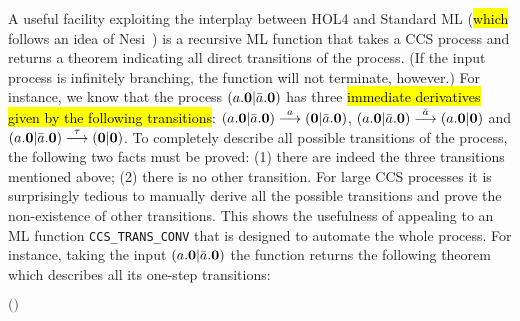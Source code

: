 A useful facility exploiting the interplay
between HOL4 and Standard ML (\hl{which} follows an idea of Nesi~\cite{Nesi:1992ve})
 is a recursive ML function that takes a CCS process and returns a theorem indicating all
  direct transitions of the process. (If the input process is
 infinitely branching, the function will not terminate, however.)
For instance, we know that the process $(a.{\boldsymbol 0} | \bar{a}.{\boldsymbol 0})$ has three
\hl{immediate derivatives given by the following transitions}:
$(a.{\boldsymbol 0} | \bar{a}.{\boldsymbol 0}) \overset{a}{\longrightarrow}
({\boldsymbol 0} | \bar{a}.{\boldsymbol 0})$, $(a.{\boldsymbol 0} | \bar{a}.{\boldsymbol 0})
\overset{\bar{a}}{\longrightarrow} (a.{\boldsymbol 0} | {\boldsymbol 0})$ and $(a.{\boldsymbol 0} | \bar{a}.{\boldsymbol 0})
\overset{\tau}{\longrightarrow} ({\boldsymbol 0} | {\boldsymbol 0})$.
To completely describe all possible transitions of the process, the
following two facts must be proved: (1) there are indeed the three
  transitions mentioned above; (2) there is no other
  transition. For large CCS processes it is surprisingly tedious to manually derive
all the possible transitions and prove the non-existence of other transitions.
This shows the usefulness of appealing to an ML function
\texttt{CCS\_TRANS\_CONV} that is designed to automate the whole process.
For instance, taking the input $(a.{\boldsymbol 0} | \bar{a}.{\boldsymbol 0})$ the function returns the
following theorem which describes all its one-step transitions:
\begin{alltt}
\HOLTokenTurnstile{} \HOLConst{\HOLTokenInputAct} \HOLSymConst{\ensuremath{\ldotp}} \HOLSymConst{\ensuremath{\mid}} \HOLConst{\HOLTokenOutputAct} \HOLSymConst{\ensuremath{\ldotp}} \HOLTokenTransBegin{}\HOLTokenTransEnd {} \HOLSymConst{\HOLTokenEquiv{}}
   \ensuremath{(} \HOLSymConst{\ensuremath{=}} \HOLConst{\HOLTokenInputAct}  \HOLSymConst{\HOLTokenConj{}}  \HOLSymConst{\ensuremath{=}}  \HOLSymConst{\ensuremath{\mid}} \HOLConst{\HOLTokenOutputAct} \HOLSymConst{\ensuremath{\ldotp}} \HOLSymConst{\HOLTokenDisj{}}  \HOLSymConst{\ensuremath{=}} \HOLConst{\HOLTokenOutputAct}  \HOLSymConst{\HOLTokenConj{}}  \HOLSymConst{\ensuremath{=}} \HOLConst{\HOLTokenInputAct} \HOLSymConst{\ensuremath{\ldotp}} \HOLSymConst{\ensuremath{\mid}} \ensuremath{)} \HOLSymConst{\HOLTokenDisj{}}
    \HOLSymConst{\ensuremath{=}} \HOLSymConst{\ensuremath{\tau}} \HOLSymConst{\HOLTokenConj{}}  \HOLSymConst{\ensuremath{=}}  \HOLSymConst{\ensuremath{\mid}} 
\end{alltt}

